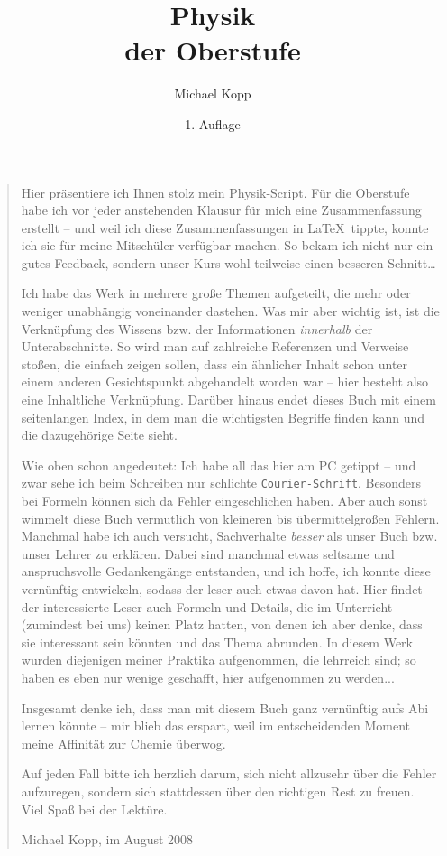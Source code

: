 \documentclass[a4paper,12pt,twoside,openany]{scrbook}
\author{Michael Kopp}
\date{1. Auflage}
\title{Physik\\der Oberstufe}
\begin{document}
\maketitle


\begin{quote}
Hier präsentiere ich Ihnen stolz mein Physik-Script. Für die Oberstufe habe ich vor jeder anstehenden Klausur für mich eine Zusammenfassung erstellt -- und weil ich diese Zusammenfassungen in \LaTeX\ tippte, konnte ich sie für meine Mitschüler verfügbar machen. So bekam ich nicht nur ein gutes Feedback, sondern unser Kurs wohl teilweise einen besseren Schnitt\dots

Ich habe das Werk in mehrere große Themen aufgeteilt, die mehr oder weniger unabhängig voneinander dastehen. Was mir aber wichtig ist, ist die Verknüpfung des Wissens bzw. der Informationen \emph{innerhalb} der Unterabschnitte. So wird man auf zahlreiche Referenzen und Verweise stoßen, die einfach zeigen sollen, dass ein ähnlicher Inhalt schon unter einem anderen Gesichtspunkt abgehandelt worden war -- hier besteht also eine Inhaltliche Verknüpfung.
Darüber hinaus endet dieses Buch mit einem seitenlangen Index, in dem man die wichtigsten Begriffe finden kann und die dazugehörige Seite sieht.

Wie oben schon angedeutet: Ich habe all das hier am PC getippt -- und zwar sehe ich beim Schreiben nur schlichte \texttt{Courier-Schrift}. Besonders bei Formeln können sich da Fehler eingeschlichen haben. Aber auch sonst wimmelt diese Buch vermutlich von kleineren bis übermittelgroßen Fehlern. Manchmal habe ich auch versucht, Sachverhalte \emph{besser} als unser Buch bzw. unser Lehrer zu erklären. Dabei sind manchmal etwas seltsame und anspruchsvolle Gedankengänge entstanden, und ich hoffe, ich konnte diese vernünftig entwickeln, sodass der leser auch etwas davon hat. Hier findet der interessierte Leser auch Formeln und Details, die im Unterricht (zumindest bei uns) keinen Platz hatten, von denen ich aber denke, dass sie interessant sein könnten und das Thema abrunden. In diesem Werk wurden diejenigen meiner Praktika aufgenommen, die lehrreich sind; so haben es eben nur wenige geschafft, hier aufgenommen zu werden...

Insgesamt denke ich, dass man mit diesem Buch ganz vernünftig aufs Abi lernen könnte -- mir blieb das erspart, weil im entscheidenden Moment meine Affinität zur Chemie überwog.

Auf jeden Fall bitte ich herzlich darum, sich nicht allzusehr über die Fehler aufzuregen, sondern sich stattdessen über den richtigen Rest zu freuen. Viel Spaß bei der Lektüre.

\begin{flushright}
     Michael Kopp, im August 2008
\end{flushright}


\end{quote}
\end{document}
